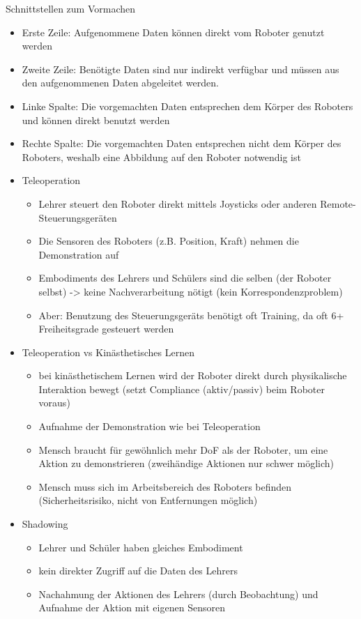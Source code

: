 \documentclass[paper=a4, fontsize=11pt]{scrartcl} %
\numberwithin{equation}{section} %
\numberwithin{figure}{section} %
\numberwithin{table}{section} %
\begin{document}
Schnittstellen zum Vormachen
\begin{itemize}
\item Erste Zeile: Aufgenommene Daten können direkt vom Roboter genutzt werden
\item Zweite Zeile: Benötigte Daten sind nur indirekt verfügbar und müssen aus den aufgenommenen Daten abgeleitet werden.
\item Linke Spalte: Die vorgemachten Daten entsprechen dem Körper des Roboters und können direkt benutzt werden
\item Rechte Spalte: Die vorgemachten Daten entsprechen nicht dem Körper des Roboters, weshalb eine Abbildung auf den Roboter notwendig ist
\item Teleoperation
\begin{itemize}
\item Lehrer steuert den Roboter direkt mittels Joysticks oder anderen Remote-Steuerungsgeräten
\item Die Sensoren des Roboters (z.B. Position, Kraft) nehmen die Demonstration auf
\item Embodiments des Lehrers und Schülers sind die selben (der Roboter selbst) -> keine Nachverarbeitung nötigt (kein Korrespondenzproblem)
\item Aber: Benutzung des Steuerungsgeräts benötigt oft Training, da oft 6+ Freiheitsgrade gesteuert werden
\end{itemize}
\item Teleoperation vs Kinästhetisches Lernen
\begin{itemize}
\item bei kinästhetischem Lernen wird der Roboter direkt durch physikalische Interaktion bewegt (setzt Compliance (aktiv/passiv) beim Roboter voraus)
\item Aufnahme der Demonstration wie bei Teleoperation
\item Mensch braucht für gewöhnlich mehr DoF als der Roboter, um eine Aktion zu demonstrieren (zweihändige Aktionen nur schwer möglich)
\item Mensch muss sich im Arbeitsbereich des Roboters befinden (Sicherheitsrisiko, nicht von Entfernungen möglich)
\end{itemize}
\item Shadowing
\begin{itemize}
\item Lehrer und Schüler haben gleiches Embodiment
\item kein direkter Zugriff auf die Daten des Lehrers
\item Nachahmung der Aktionen des Lehrers (durch Beobachtung) und Aufnahme der Aktion mit eigenen Sensoren

\end{itemize}
\end{itemize}
\end{document}
